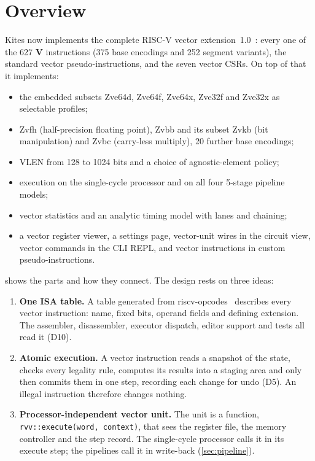 \documentclass[11pt]{article}
\begin{document}
\tableofcontents
\clearpage

\section{Overview}\label{sec:overview}

Kites now implements the complete RISC-V vector extension~1.0~\cite{spec}: every one of the 627
\textbf{V} instructions (375 base encodings and 252 segment variants), the standard vector
pseudo-instructions, and the seven vector CSRs. On top of that it implements:

\begin{itemize}
\item the embedded subsets Zve64d, Zve64f, Zve64x, Zve32f and Zve32x as selectable profiles;
\item Zvfh (half-precision floating point), Zvbb and its subset Zvkb (bit manipulation) and Zvbc
      (carry-less multiply), 20 further base encodings;
\item VLEN from 128 to 1024 bits and a choice of agnostic-element policy;
\item execution on the single-cycle processor and on all four 5-stage pipeline models;
\item vector statistics and an analytic timing model with lanes and chaining;
\item a vector register viewer, a settings page, vector-unit wires in the circuit view, vector
      commands in the CLI REPL, and vector instructions in custom pseudo-instructions.
\end{itemize}

 shows the parts and how they connect. The design rests on three ideas:

\begin{enumerate}
\item \textbf{One ISA table.} A table generated from riscv-opcodes~\cite{opcodes} describes every
      vector instruction: name, fixed bits, operand fields and defining extension. The assembler,
      disassembler, executor dispatch, editor support and tests all read it (D10).
\item \textbf{Atomic execution.} A vector instruction reads a snapshot of the state, checks every
      legality rule, computes its results into a staging area and only then commits them in one
      step, recording each change for undo (D5). An illegal instruction therefore changes nothing.
\item \textbf{Processor-independent vector unit.} The unit is a function,
      \texttt{rvv::execute(word, context)}, that sees the register file, the memory controller
      and the step record. The single-cycle processor calls it in its execute step; the pipelines
      call it in write-back (\cref{sec:pipeline}).
\end{enumerate}
\end{document}
